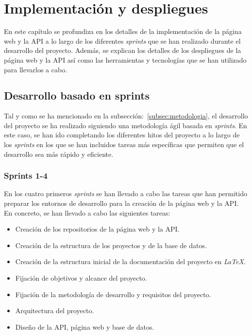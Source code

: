 \chapter{Implementación y despliegues}\label{ch:implementacion-y-despliegues}

En este capítulo se profundiza en los detalles de la implementación de la página web y la API a lo largo de los diferentes
\textit{sprints} que se han realizado durante el desarrollo del proyecto. Además, se explican los detalles de los despliegues
de la página web y la API así como las herramientas y tecnologías que se han utilizado para llevarlos a cabo.

\section{Desarrollo basado en sprints}\label{sec:desarrollo-basado-en-sprints}

Tal y como se ha mencionado en la subsección:~\ref{subsec:metodologia}, el desarrollo del proyecto se ha
realizado siguiendo una metodología ágil basada en \textit{sprints}. En este caso, se han ido completando los diferentes hitos del proyecto a lo largo de los
\textit{sprints} en los que se han incluidos tareas más específicas que permiten que el desarrollo sea más rápido y
eficiente.

\subsection{Sprints 1-4}\label{subsec:sprints-1-4}

En los cuatro primeros \textit{sprints} se han llevado a cabo las tareas que han permitido preparar los entornos de desarrollo
para la creación de la página web y la API. En concreto, se han llevado a cabo las siguientes tareas:

\begin{itemize}
    \item Creación de los repositorios de la página web y la API.
    \item Creación de la estructura de los proyectos y de la base de datos.
    \item Creación de la estructura inicial de la documentación del proyecto en \textit{LaTeX}.
    \item Fijación de objetivos y alcance del proyecto.
    \item Fijación de la metodología de desarrollo y requisitos del proyecto.
    \item Arquitectura del proyecto.
    \item Diseño de la API, página web y base de datos.
\end{itemize}

